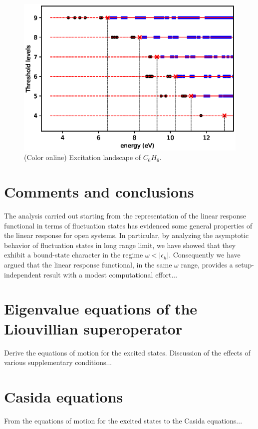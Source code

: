 \documentclass[reprint,aps,prb]{revtex4-1}
\newcommand{\eps}{\epsilon}
\begin{document}
\begin{figure}[ht]
\includegraphics[scale=0.56]{c6h6_excitationLandscape.eps}
\caption{\label{c6h6_excLand}(Color online) Excitation landscape of $C_6H_6$.}
\end{figure}

\section{Comments and conclusions}

The analysis carried out starting from the representation of the linear response functional in terms of fluctuation states has evidenced some general properties of the linear response
for open systems. In particular, by analyzing the asymptotic behavior of fluctuation states in long range limit, we have showed that they exhibit a bound-state character in the regime  
$\omega<|\eps_h|$. Consequently we have argued that the linear response functional, in the same $\omega$ range, provides a setup-independent result with a modest computational effort... 

\appendix
\section{Eigenvalue equations of the Liouvillian superoperator}

Derive the equations of motion for the excited states. Discussion of the effects of various supplementary conditions...

\section{Casida equations}

From the equations of motion for the excited states to the Casida equations...


%

\end{document}
